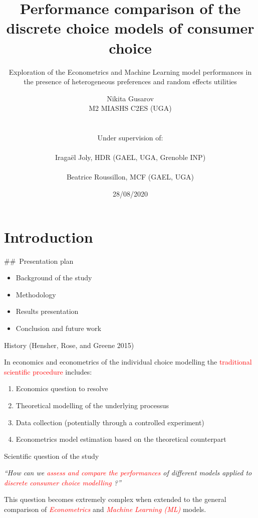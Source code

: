 \documentclass[11pt,ignorenonframetext,]{beamer}
\title{Performance comparison of the discrete choice models of consumer choice}
\subtitle{Exploration of the Econometrics and Machine Learning model performances
in the presence of heterogeneous preferences and random effects
utilities}
\author{Nikita Gusarov\\
\scriptsize M2 MIASHS C2ES (UGA)\\
~\\
\raggedright\scriptsize Under supervision of:\\
\raggedright\hspace{10mm}\scriptsize Iragaël Joly, HDR (GAEL, UGA,
Grenoble INP)\\
\raggedright\hspace{10mm}\scriptsize Beatrice Roussillon, MCF (GAEL,
UGA)}
\date{28/08/2020}
\providecommand{\tightlist}{%
  \setlength{\itemsep}{0pt}\setlength{\parskip}{0pt}}
\begin{document}
\frame{\titlepage}

\hypertarget{introduction}{%
\section{Introduction}\label{introduction}}

\#\#~Presentation plan

\begin{itemize}
\tightlist
\item
  Background of the study
\item
  Methodology
\item
  Results presentation
\item
  Conclusion and future work
\end{itemize}

\begin{frame}{History (Hensher, Rose, and Greene 2015)}
\protect\hypertarget{history-hensher2015}{}

In economics and econometrics of the individual choice modelling the
\textcolor{red}{traditional scientific procedure} includes:

\begin{enumerate}
\tightlist
\item
  Economics question to resolve
\item
  Theoretical modelling of the underlying processus
\item
  Data collection (potentially through a controlled experiment)
\item
  Econometrics model estimation based on the theoretical counterpart
\end{enumerate}

\end{frame}

\begin{frame}{Scientific question of the study}
\protect\hypertarget{scientific-question-of-the-study}{}

\emph{``How can we \textcolor{red}{assess and compare the performances}
of different models applied to
\textcolor{red}{discrete consumer choice modelling} ?''}

This question becomes extremely complex when extended to the general
comparison of \emph{\textcolor{red}{Econometrics}} and
\emph{\textcolor{red}{Machine Learning (ML)}} models.

\end{frame}
\end{document}
